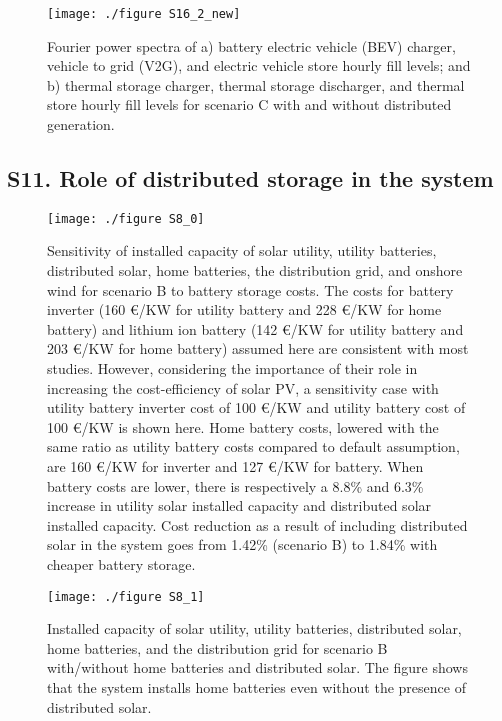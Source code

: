 	\begin{figure}[H]
		\renewcommand*{\thefigure}{S\arabic{figure}}
		
		\texttt{[image: ./figure S16\_2\_new]}
		\caption{Fourier power spectra of a) battery electric vehicle (BEV) charger, vehicle to grid (V2G), and electric vehicle store hourly fill levels; and b) thermal storage charger, thermal storage discharger, and thermal store hourly fill levels for scenario C with and without distributed generation. 
		}
	\end{figure}
	
	\subsection*{S11. Role of distributed storage in the system}
	
	\begin{figure}[H]
		\renewcommand*{\thefigure}{S\arabic{figure}}
		
		\texttt{[image: ./figure S8\_0]}
		\caption{Sensitivity of installed capacity of solar utility, utility batteries, distributed solar, home batteries, the distribution grid, and onshore wind for scenario B to battery storage costs. The costs for battery inverter (160 €/KW for utility battery\protect{} and 228 €/KW for home battery\protect{}) and lithium ion battery (142 €/KW for utility battery\protect{} and 203 €/KW for home battery\protect{}) assumed here are consistent with most studies\protect{}. However, considering the importance of their role in increasing the cost-efficiency of solar PV, a sensitivity case with utility battery inverter cost of 100 €/KW \protect{} and utility battery cost of 100 €/KW\protect{} is shown here. Home battery costs, lowered with the same ratio as utility battery costs compared to default assumption, are 160 €/KW for inverter and 127 €/KW for battery. When battery costs are lower, there is respectively a 8.8\% and 6.3\% increase in utility solar installed capacity and distributed solar installed capacity. Cost reduction as a result of including distributed solar in the system goes from 1.42\% (scenario B) to 1.84\% with cheaper battery storage. }
	\end{figure}
	
	\begin{figure}[H]
		\renewcommand*{\thefigure}{S\arabic{figure}}
		
		\texttt{[image: ./figure S8\_1]}
		\caption{Installed capacity of solar utility, utility batteries, distributed solar, home batteries, and the distribution grid for scenario B with/without home batteries and distributed solar. The figure shows that the system installs home batteries even without the presence of distributed solar.}
	\end{figure}
	
